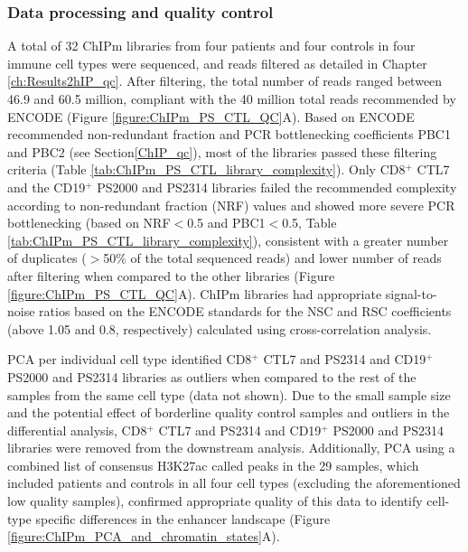 \subsubsection{Data processing and quality control}

A total of 32 ChIPm libraries from four patients and four controls in four immune cell types were sequenced, and reads filtered as detailed in Chapter \ref{ch:Results2hIP_qc}. After filtering, the total number of reads ranged between 46.9 and 60.5 million, compliant with the 40 million total reads recommended by ENCODE (Figure \ref{figure:ChIPm_PS_CTL_QC}A). Based on ENCODE recommended non-redundant fraction and PCR bottlenecking coefficients PBC1 and PBC2 (see Section\ref{ChIP_qc}), most of the libraries passed these filtering criteria (Table \ref{tab:ChIPm_PS_CTL_library_complexity}). Only CD8$^+$ CTL7 and the CD19$^+$ PS2000 and PS2314 libraries failed the recommended complexity according to non-redundant fraction (NRF) values and showed more severe PCR bottlenecking (based on NRF$<$0.5 and PBC1$<$0.5, Table \ref{tab:ChIPm_PS_CTL_library_complexity}), consistent with a greater number of duplicates ($>$50\% of the total sequenced reads) and lower number of reads after filtering when compared to the other libraries (Figure \ref{figure:ChIPm_PS_CTL_QC}A). ChIPm libraries had appropriate signal-to-noise ratios based on the ENCODE standards \parencite{Landt2012}for the NSC and RSC coefficients (above 1.05 and 0.8, respectively) calculated using cross-correlation analysis.

PCA per individual cell type identified CD8$^+$ CTL7 and PS2314 and CD19$^+$ PS2000 and PS2314 libraries as outliers when compared to the rest of the samples from the same cell type (data not shown). Due to the small sample size and the potential effect of borderline quality control samples and outliers in the differential analysis, CD8$^+$ CTL7 and PS2314 and CD19$^+$ PS2000 and PS2314 libraries were removed from the downstream analysis. Additionally, PCA using a combined list of consensus H3K27ac called peaks in the 29 samples, which included patients and controls in all four cell types (excluding the aforementioned low quality samples), confirmed appropriate quality of this data to identify cell-type specific differences in the enhancer landscape (Figure \ref{figure:ChIPm_PCA_and_chromatin_states}A). 
 

